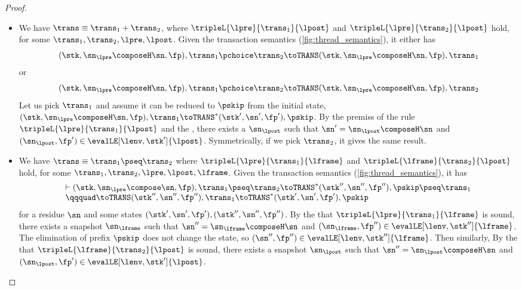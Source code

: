 \begin{proof}
\begin{itemize}
\item {}
We have  \(\trans \equiv \trans_{1} + \trans_{2} \), where \( \tripleL{\lpre}{\trans_{1}}{\lpost} \) and \( \tripleL{\lpre}{\trans_{2}}{\lpost} \) hold, for some \( \trans_{1}, \trans_{2}, \lpre, \lpost \).
Given the transaction semantics (\cref{fig:thread_semantics}), it either has 
\[ 
( \stk, \sn_\lpre \composeH \sn, \fp ), \trans_{1} \pchoice \trans_{2} \toTRANS ( \stk, \sn_\lpre \composeH \sn, \fp ), \trans_{1} 
\]
or  
\[ 
( \stk, \sn_\lpre \composeH \sn, \fp ), \trans_{1} \pchoice \trans_{2} \toTRANS ( \stk, \sn_\lpre \composeH \sn, \fp ), \trans_{2} 
\]
Let us pick \( \trans_{1} \) and  assume it can be reduced to \( \pskip \) from the initial state, \ie \( ( \stk, \sn_\lpre \composeH \sn, \fp ), \trans_{1}  \toTRANS^{*} ( \stk', \sn', \fp' ), \pskip \).
By the premiss of the rule \( \tripleL{\lpre}{\trans_{1}}{\lpost} \) and the \ih, 
there exists a \( \sn_\lpost \) such that \( \sn' = \sn_\lpost \composeH \sn \) and  \( (\sn_\lpost, \fp') \in \evalLE[\lenv, \stk']{\lpost} \).
Symmetrically, if we pick \( \trans_{2} \), it gives the same result.

\item {}
We have \( \trans \equiv \trans_{1} \pseq \trans_{2} \) where \( \tripleL{\lpre}{\trans_{1}}{\lframe} \) and \( \tripleL{\lframe}{\trans_{2}}{\lpost} \) hold, for some \( \trans_{1}, \trans_{2}, \lpre, \lpost, \lframe \).
Given the transaction semantics (\cref{fig:thread_semantics}), 
it has 
\[
    \begin{array}{l}
    \vdash ( \stk, \sn_\lpre \compose \sn, \fp ), \trans_{1} \pseq \trans_{2} \toTRANS^{*} ( \stk'', \sn'', \fp'' ), \pskip \pseq \trans_{1} \\
    \qqquad \toTRANS ( \stk'', \sn'', \fp'' ), \trans_{1} \toTRANS^{*} ( \stk', \sn', \fp' ), \pskip 
\end{array}
\] 
for a residue \( \sn \) and  some states \( (\stk', \sn', \fp'), (\stk'', \sn'', \fp'') \).
By the \ih that \( \tripleL{\lpre}{\trans_{1}}{\lframe} \) is sound,
there exists a snapshot \( \sn_\lframe \) such that \( \sn'' = \sn_\lframe \composeH \sn \) and \( (\sn_\lframe, \fp'') \in \evalLE[\lenv, \stk'']{\lframe} \).
The elimination of prefix \( \pskip \) does not change the state, so \( (\sn'', \fp'') \in \evalLE[\lenv, \stk'']{\lframe} \).
Then similarly, 
By the \ih that \( \tripleL{\lframe}{\trans_{2}}{\lpost} \) is sound,
there exists a snapshot \( \sn_\lpost \) such that \( \sn'' = \sn_\lpost \composeH \sn \) and \( (\sn_\lpost, \fp') \in \evalLE[\lenv, \stk']{\lpost} \).


\end{itemize}
\end{proof}
